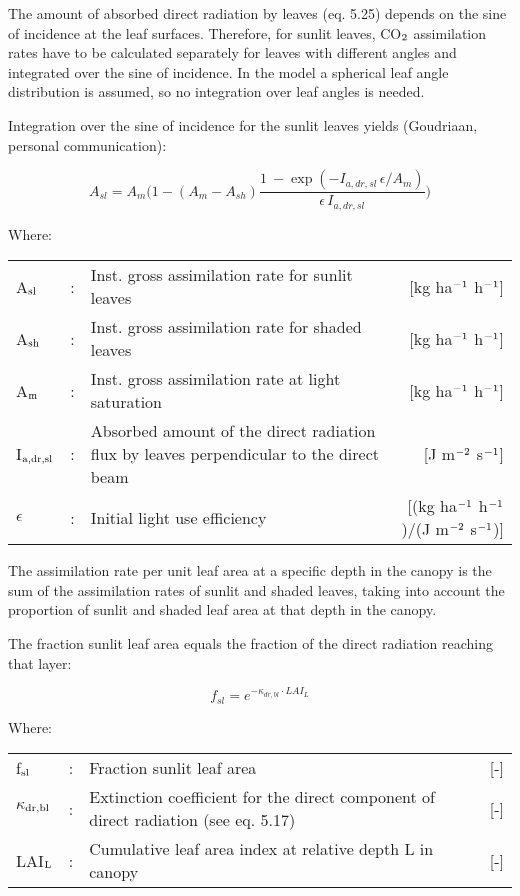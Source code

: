 The amount of absorbed direct radiation by leaves (eq. 5.25) depends on the sine of
incidence at the leaf surfaces. Therefore, for sunlit leaves, CO$_{{\rm 2}}$ assimilation rates have to
be calculated separately for leaves with different angles and integrated over the sine of
incidence. In the model a spherical leaf angle distribution is assumed, so no integration
over leaf angles is needed.

Integration over the sine of incidence for the sunlit leaves yields (Goudriaan, personal
communication):

\begin{equation}
A_{sl} = A_{m} \bigg( 
   1-(A_{m} - A_{sh})  {\frac{1~- \exp({{-I _{a,dr,sl} \, \epsilon}}/{A_m}) }
                             {\epsilon\, I _{a,dr,sl} }}
   \bigg)
\end{equation}

Where:\\[5pt]
\begin{tabularx}{\textwidth}{llXr}
A$_{{\rm sl}}$ &:& Inst. gross assimilation rate for sunlit leaves  &
    [kg ha$^{{\rm -1}}$ h$^{{\rm -1}}$]\\
A$_{{\rm sh}}$ &:& Inst. gross assimilation rate for shaded leaves  &
    [kg ha$^{{\rm -1}}$ h$^{{\rm -1}}$]\\
A$_{{\rm m}}$ &:& Inst. gross assimilation rate at light saturation &
    [kg ha$^{{\rm -1}}$ h$^{{\rm -1}}$]\\
I$_{{\rm a,dr,sl}}$ &:& Absorbed amount of the direct radiation flux by leaves
    perpendicular to the direct beam  &  [J m$^{{\rm -2}}$ s$^{{\rm -1}}$]\\
$\epsilon$ &:& Initial light use efficiency  &   [(kg ha$^{{\rm -1}}$ 
    h$^{{\rm -1}}$)/(J m$^{{\rm -2}}$ s$^{{\rm -1}}$)]\\
\end{tabularx}

The assimilation rate per unit leaf area at a specific depth in the canopy is the sum of the
assimilation rates of sunlit and shaded leaves, taking into account the proportion of sunlit
and shaded leaf area at that depth in the canopy. 

The fraction sunlit leaf area equals the fraction of the direct radiation reaching that layer:

\begin{equation}
f_{sl} =  e^{-\kappa_{dr,bl} \cdot LAI_{L}}
\end{equation}
 
Where:\\[5pt]
\begin{tabularx}{\textwidth}{llXr}
f$_{{\rm sl}}$ &:& Fraction sunlit leaf area   &     [-]\\
$\kappa$$_{{\rm dr,bl}}$ &:& Extinction coefficient for the direct component of
   direct radiation (see eq. 5.17)   &     [-]\\
LAI$_{{\rm L}}$ &:& Cumulative leaf area index at relative depth L in canopy  &      [-]
\end{tabularx}


